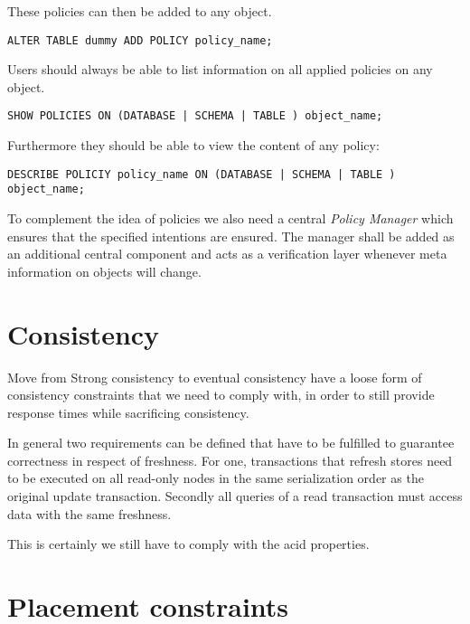 These policies can then be added to any object.
\begin{verbatim}
ALTER TABLE dummy ADD POLICY policy_name;
\end{verbatim}

Users should always be able to list information on all applied policies on any object.
\begin{verbatim}
SHOW POLICIES ON (DATABASE | SCHEMA | TABLE ) object_name;
\end{verbatim}


Furthermore they should be able to view the content of any policy: 
\begin{verbatim}
DESCRIBE POLICIY policy_name ON (DATABASE | SCHEMA | TABLE ) object_name; 
\end{verbatim}

To complement the idea of policies we also need a central \emph{Policy Manager} which ensures that the specified intentions are ensured.
The manager shall be added as an additional central component and acts as a verification layer whenever meta information on objects will change.






\section{Consistency}
\label{sec:consistency_concept}
Move from Strong consistency to eventual consistency 
have a loose form of consistency constraints that we need to comply with, in order to still provide response times while sacrificing consistency.

In general two requirements can be defined that have to be fulfilled to
guarantee correctness in respect of freshness. For one, transactions that refresh stores need to be executed on all read-only nodes in the same serialization order as the 
original update transaction. Secondly all queries of a read transaction must access data with the same freshness. 



This is certainly we still have to comply with the acid properties. 

\section{Placement constraints}